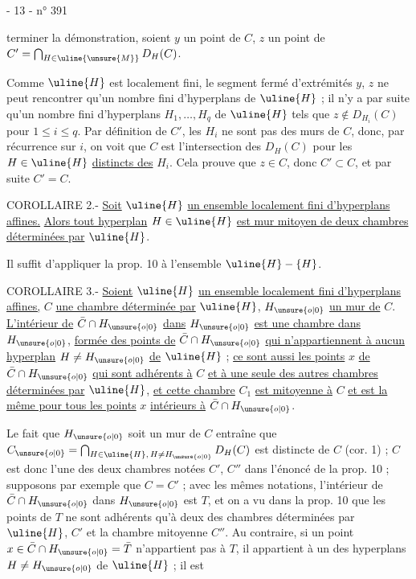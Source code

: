 
- 13 -
\hfill n° 391

terminer la démonstration, soient $y$ un point de $C$, $z$ un point de $C'=\bigcap_{H\in\uline{\unsure{M}}}D_H(C)$.

Comme $\uline{H}$ est localement fini, le segment fermé d'extrémités $y$, $z$ ne peut rencontrer qu'un nombre fini d'hyperplans de $\uline{H}$ ; il n'y a par suite qu'un nombre fini d'hyperplans $H_1,\ldots,H_q$ de $\uline{H}$ tels que $z\notin D_{H_i}(C)$ pour $1\leq i\leq q$. Par définition de $C'$, les $H_i$ ne sont pas des murs de $C$, donc, par récurrence sur $i$, on voit que $C$ est l'intersection des $D_H(C)$ pour les $H\in\uline{H}$ \uline{distincts des} $H_i$. Cela prouve que $z\in C$, donc $C'\subset C$, et par suite $C'=C$.

COROLLAIRE 2.- \uline{Soit} $\uline{H}$ \uline{un ensemble localement fini d'hyperplans affines.} \uline{Alors tout hyperplan} $H\in\uline{H}$ \uline{est mur mitoyen de deux chambres déterminées par} $\uline{H}$.

Il suffit d'appliquer la prop. 10 à l'ensemble $\uline{H}-\{H\}$.

COROLLAIRE 3.- \uline{Soient} $\uline{H}$ \uline{un ensemble localement fini d'hyperplans affines,} $C$ \uline{une chambre déterminée par} $\uline{H}$, $H_{\unsure{o|0}}$ \uline{un mur de} $C$. \uline{L'intérieur de} $\bar C\cap H_{\unsure{o|0}}$ \uline{dans} $H_{\unsure{o|0}}$ \uline{est une chambre dans} $H_{\unsure{o|0}}$, \uline{formée des points de} $\bar C\cap H_{\unsure{o|0}}$ \uline{qui n'appartiennent à aucun hyperplan} $H\neq H_{\unsure{o|0}}$ \uline{de} $\uline{H}$ ; \uline{ce sont aussi les points} $x$ \uline{de} $\bar C\cap H_{\unsure{o|0}}$ \uline{qui sont adhérents à} $C$ \uline{et à une seule des autres chambres déterminées par} $\uline{H}$, \uline{et cette chambre} $C_1$ \uline{est mitoyenne à} $C$ \uline{et est la même pour tous les points} $x$ \uline{intérieurs à} $\bar C\cap H_{\unsure{o|0}}$.

Le fait que $H_{\unsure{o|0}}$ soit un mur de $C$ entraîne que $C_{\unsure{o|0}}=\bigcap_{H\in\uline{H},\,H\neq H_{\unsure{o|0}}}D_H(C)$ est distincte de $C$ (cor. 1) ; $C$ est donc l'une des deux chambres notées $C'$, $C''$ dans l'énoncé de la prop. 10 ; supposons par exemple que $C=C'$ ; avec les mêmes notations, l'intérieur de $\bar C\cap H_{\unsure{o|0}}$ dans $H_{\unsure{o|0}}$ est $T$, et on a vu dans la prop. 10 que les points de $T$ ne sont adhérents qu'à deux des chambres déterminées par $\uline{H}$, $C'$ et la chambre mitoyenne $C''$. Au contraire, si un point $x\in\bar C\cap H_{\unsure{o|0}}=\bar T$ n'appartient pas à $T$, il appartient à un des hyperplans $H\neq H_{\unsure{o|0}}$ de $\uline{H}$ ; il est
